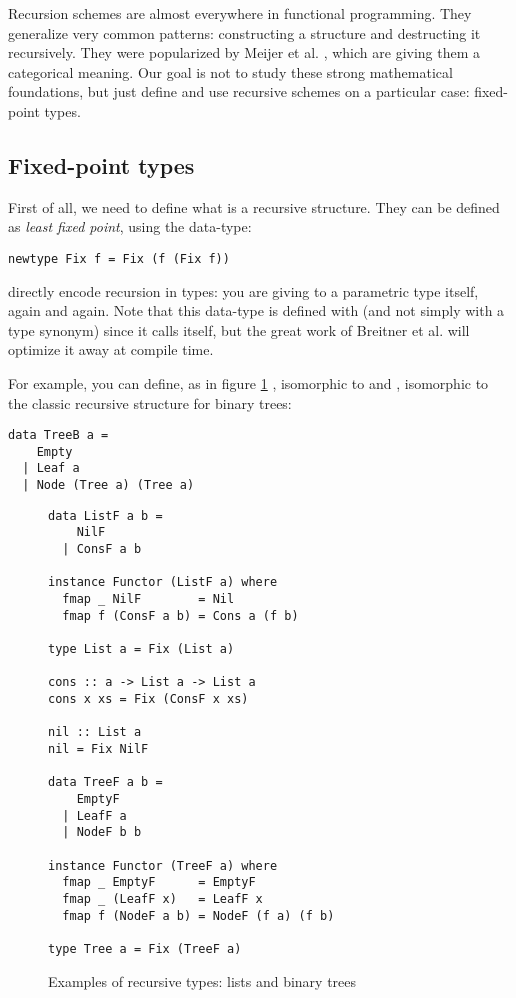 
Recursion schemes are almost everywhere in functional programming. They generalize very common patterns: constructing a structure and destructing it recursively. They were popularized by Meijer et al. \cite{4cec4a43c86444479dc0003182424795}, which are giving them a categorical meaning. Our goal is not to study these strong mathematical foundations, but just define and use recursive schemes on a particular case: fixed-point types.

\subsection{Fixed-point types}
\label{subsec:defi}
First of all, we need to define what is a recursive structure. They can be defined as \emph{least fixed point}, using the  data-type:
\begin{verbatim}
newtype Fix f = Fix (f (Fix f))
\end{verbatim}
 directly encode recursion in types: you are giving to a parametric type itself, again and again. Note that this data-type is defined with  (and not simply with a type synonym) since it calls itself, but the great work of Breitner et al. \cite{Breitner:2014:SZC:2692915.2628141} will optimize it away at compile time.

For example, you can define, as in figure \ref{fig:listtree}
, isomorphic to \minline{[a]} and , isomorphic to the classic recursive structure for binary trees:
\begin{verbatim}
data TreeB a =
    Empty
  | Leaf a
  | Node (Tree a) (Tree a)
\end{verbatim}

\begin{figure}
\begin{verbatim}
data ListF a b =
    NilF
  | ConsF a b

instance Functor (ListF a) where
  fmap _ NilF        = Nil
  fmap f (ConsF a b) = Cons a (f b)

type List a = Fix (List a)

cons :: a -> List a -> List a
cons x xs = Fix (ConsF x xs)

nil :: List a
nil = Fix NilF

data TreeF a b =
    EmptyF
  | LeafF a
  | NodeF b b

instance Functor (TreeF a) where
  fmap _ EmptyF      = EmptyF
  fmap _ (LeafF x)   = LeafF x
  fmap f (NodeF a b) = NodeF (f a) (f b)

type Tree a = Fix (TreeF a)
\end{verbatim}
\caption{Examples of recursive types: lists and binary trees}
\label{fig:listtree}
\end{figure}

